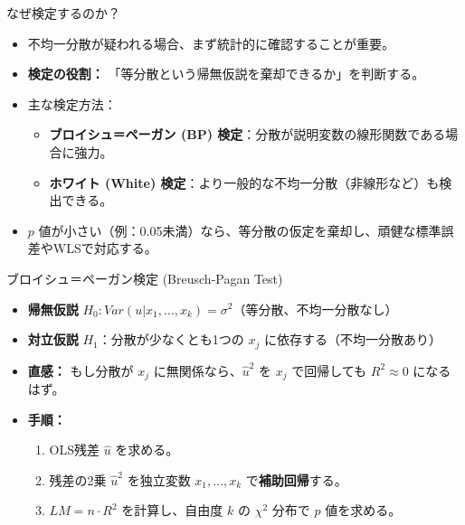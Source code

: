 \documentclass[
  ignorenonframetext,
]{beamer}
\providecommand{\tightlist}{%
  \setlength{\itemsep}{0pt}\setlength{\parskip}{0pt}}
\begin{document}
\begin{frame}{なぜ検定するのか？}
\label{ux306aux305cux691cux5b9aux3059ux308bux306eux304b}
\begin{itemize}
\tightlist
\item
  不均一分散が疑われる場合、まず統計的に確認することが重要。
\item
  \textbf{検定の役割：}
  「等分散という帰無仮説を棄却できるか」を判断する。
\item
  主な検定方法：

  \begin{itemize}
  \tightlist
  \item
    \textbf{ブロイシュ＝ペーガン (BP)
    検定}：分散が説明変数の線形関数である場合に強力。
  \item
    \textbf{ホワイト (White)
    検定}：より一般的な不均一分散（非線形など）も検出できる。
  \end{itemize}
\item
  \(p\)
  値が小さい（例：0.05未満）なら、等分散の仮定を棄却し、頑健な標準誤差やWLSで対応する。
\end{itemize}
\end{frame}

\begin{frame}{ブロイシュ＝ペーガン検定 (Breusch-Pagan Test)}
\label{ux30d6ux30edux30a4ux30b7ux30e5ux30daux30fcux30acux30f3ux691cux5b9a-breusch-pagan-test}
\begin{itemize}
\tightlist
\item
  \textbf{帰無仮説}
  \(H_0: Var(u|x_1, \dots, x_k) = \sigma^2\)（等分散、不均一分散なし）
\item
  \textbf{対立仮説} \(H_1\)：分散が少なくとも1つの \(x_j\)
  に依存する（不均一分散あり）
\item
  \textbf{直感：} もし分散が \(x_j\) に無関係なら、\(\hat{u}^2\) を
  \(x_j\) で回帰しても \(R^2 \approx 0\) になるはず。
\item
  \textbf{手順：}

  \begin{enumerate}
  \tightlist
  \item
    OLS残差 \(\hat{u}\) を求める。
  \item
    残差の2乗 \(\hat{u}^2\) を独立変数 \(x_1, \dots, x_k\)
    で\textbf{補助回帰}する。
  \item
    \(LM = n \cdot R^2\) を計算し、自由度 \(k\) の \(\chi^2\) 分布で
    \(p\) 値を求める。
  \end{enumerate}
\end{itemize}
\end{frame}
\end{document}
